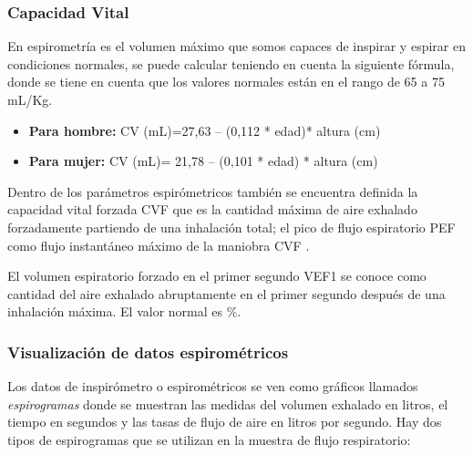 \documentclass[12pt]{article}
\begin{document}
\subsubsection{Capacidad Vital} 

En espirometría es el volumen máximo que somos capaces de inspirar y espirar en condiciones normales, se puede calcular teniendo en cuenta la siguiente fórmula, donde se tiene en cuenta que los valores normales están en el rango de 65 a 75 mL/Kg.


\begin{itemize}
    \item \textbf{Para hombre:} CV (mL)=27,63 – (0,112 * edad)* altura (cm)
    \item \textbf{Para mujer:} CV (mL)= 21,78 – (0,101 * edad) * altura (cm)
\end{itemize}

Dentro de los parámetros espirómetricos también se encuentra definida la capacidad vital forzada CVF que es la cantidad máxima de aire exhalado forzadamente partiendo de una inhalación total; el pico de flujo espiratorio PEF como flujo instantáneo máximo de la maniobra CVF \cite{29}.

El volumen espiratorio forzado en el primer segundo VEF1 se conoce como cantidad del aire exhalado abruptamente en el primer segundo después de una inhalación máxima. El valor normal es  \%.



\subsubsection{Visualización de datos espirométricos}  %

Los datos de inspirómetro o espirométricos se ven como gráficos llamados \textit{espirogramas} donde se muestran las medidas del volumen exhalado en litros, el tiempo en segundos y las tasas de flujo de aire en litros por segundo. Hay dos tipos de espirogramas que se utilizan en la muestra de flujo respiratorio:
\end{document}
